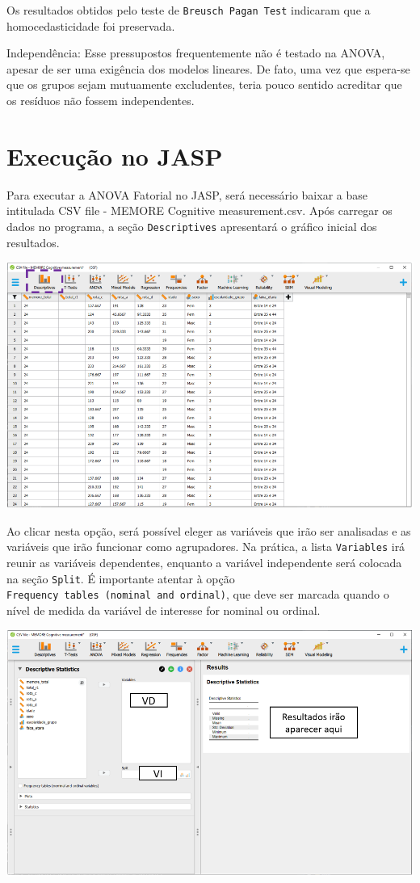 \documentclass[
]{book}
\begin{document}
Os resultados obtidos pelo teste de \texttt{Breusch\ Pagan\ Test} indicaram que a homocedasticidade foi preservada.

Independência: Esse pressupostos frequentemente não é testado na ANOVA, apesar de ser uma exigência dos modelos lineares. De fato, uma vez que espera-se que os grupos sejam mutuamente excludentes, teria pouco sentido acreditar que os resíduos não fossem independentes.

\hypertarget{execuuxe7uxe3o-no-jasp-9}{%
\section{Execução no JASP}\label{execuuxe7uxe3o-no-jasp-9}}

Para executar a ANOVA Fatorial no JASP, será necessário baixar a base intitulada CSV file - MEMORE Cognitive measurement.csv. Após carregar os dados no programa, a seção \texttt{Descriptives} apresentará o gráfico inicial dos resultados.

\includegraphics{./img/cap_anova_two_way_descriptives.png}

Ao clicar nesta opção, será possível eleger as variáveis que irão ser analisadas e as variáveis que irão funcionar como agrupadores. Na prática, a lista \texttt{Variables} irá reunir as variáveis dependentes, enquanto a variável independente será colocada na seção \texttt{Split}. É importante atentar à opção \texttt{Frequency\ tables\ (nominal\ and\ ordinal)}, que deve ser marcada quando o nível de medida da variável de interesse for nominal ou ordinal.

\includegraphics{./img/cap_anova_two_way_descriptives2.png}
\end{document}

